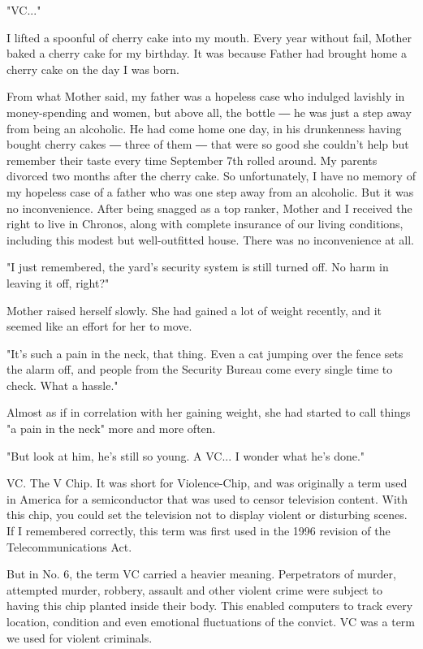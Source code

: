 "VC..."

I lifted a spoonful of cherry cake into my mouth. Every year without
fail, Mother baked a cherry cake for my birthday. It was because Father
had brought home a cherry cake on the day I was born.

From what Mother said, my father was a hopeless case who indulged
lavishly in money-spending and women, but above all, the bottle ― he was
just a step away from being an alcoholic. He had come home one day, in
his drunkenness having bought cherry cakes ― three of them ― that were
so good she couldn't help but remember their taste every time September
7th rolled around. My parents divorced two months after the cherry cake.
So unfortunately, I have no memory of my hopeless case of a father who
was one step away from an alcoholic. But it was no inconvenience. After
being snagged as a top ranker, Mother and I received the right to live
in Chronos, along with complete insurance of our living conditions,
including this modest but well-outfitted house. There was no
inconvenience at all.

"I just remembered, the yard's security system is still turned off. No
harm in leaving it off, right?"

Mother raised herself slowly. She had gained a lot of weight recently,
and it seemed like an effort for her to move.

"It's such a pain in the neck, that thing. Even a cat jumping over the
fence sets the alarm off, and people from the Security Bureau come every
single time to check. What a hassle."

Almost as if in correlation with her gaining weight, she had started to
call things "a pain in the neck" more and more often.

"But look at him, he's still so young. A VC... I wonder what he's done."

VC. The V Chip. It was short for Violence-Chip, and was originally a
term used in America for a semiconductor that was used to censor
television content. With this chip, you could set the television not to
display violent or disturbing scenes. If I remembered correctly, this
term was first used in the 1996 revision of the Telecommunications Act.

But in No. 6, the term VC carried a heavier meaning. Perpetrators of
murder, attempted murder, robbery, assault and other violent crime were
subject to having this chip planted inside their body. This enabled
computers to track every location, condition and even emotional
fluctuations of the convict. VC was a term we used for violent
criminals.


